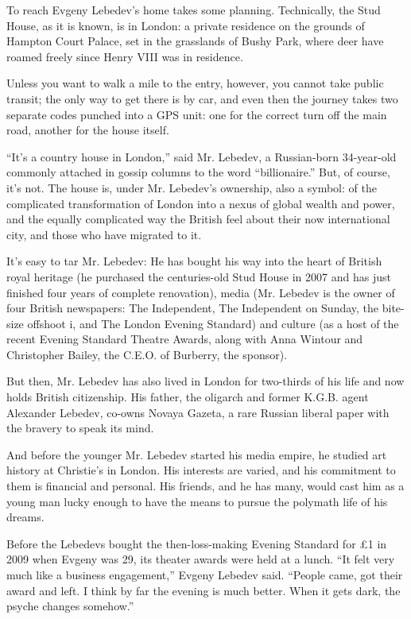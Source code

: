 To reach Evgeny Lebedev's home takes some planning. Technically, the
Stud House, as it is known, is in London: a private residence on the
grounds of Hampton Court Palace, set in the grasslands of Bushy Park,
where deer have roamed freely since Henry VIII was in residence.

Unless you want to walk a mile to the entry, however, you cannot take
public transit; the only way to get there is by car, and even then the
journey takes two separate codes punched into a GPS unit: one for the
correct turn off the main road, another for the house itself.

``It's a country house in London,'' said Mr. Lebedev, a Russian-born
34-year-old commonly attached in gossip columns to the word
``billionaire.'' But, of course, it's not. The house is, under Mr.
Lebedev's ownership, also a symbol: of the complicated transformation of
London into a nexus of global wealth and power, and the equally
complicated way the British feel about their now international city, and
those who have migrated to it.

It's easy to tar Mr. Lebedev: He has bought his way into the heart of
British royal heritage (he purchased the centuries-old Stud House in
2007 and has just finished four years of complete renovation), media
(Mr. Lebedev is the owner of four British newspapers: The Independent,
The Independent on Sunday, the bite-size offshoot i, and The London
Evening Standard) and culture (as a host of the recent Evening Standard
Theatre Awards, along with Anna Wintour and Christopher Bailey, the
C.E.O. of Burberry, the sponsor).

But then, Mr. Lebedev has also lived in London for two-thirds of his
life and now holds British citizenship. His father, the oligarch and
former K.G.B. agent Alexander Lebedev, co-owns Novaya Gazeta, a rare
Russian liberal paper with the bravery to speak its mind.

And before the younger Mr. Lebedev started his media empire, he studied
art history at Christie's in London. His interests are varied, and his
commitment to them is financial and personal. His friends, and he has
many, would cast him as a young man lucky enough to have the means to
pursue the polymath life of his dreams.

Before the Lebedevs bought the then-loss-making Evening Standard for £1
in 2009 when Evgeny was 29, its theater awards were held at a lunch.
``It felt very much like a business engagement,'' Evgeny Lebedev said.
``People came, got their award and left. I think by far the evening is
much better. When it gets dark, the psyche changes somehow.''

